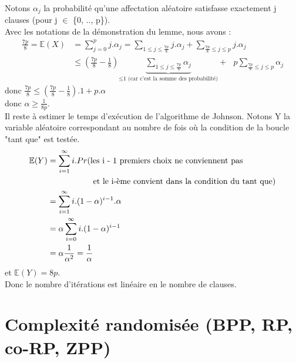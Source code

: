\documentclass[12pt,a4paper]{article}
\newcommand\tab[1][0.65cm]{\hspace*{#1}}
\begin{document}
Notons $\alpha_j$ la probabilité qu'une affectation aléatoire satisfasse exactement j clauses (pour j $\in$ \{0, .., p\}).\\
Avec les notations de la démonstration du lemme, nous avons :
\begin{equation}
\begin{split}\nonumber
\frac{7p}{8} = \mathbb{E}(X) &= \sum\limits_{j = 0}^{p} j.\alpha_j = \sum\limits_{1 \leq j \leq \frac{7p}{8}} j.\alpha_j + \sum\limits_{\frac{7p}{8} \leq j \leq p} j.\alpha_j\\
&\leq (\frac{7p}{8} - \frac{1}{8})\underbrace{\sum\limits_{1 \leq j \leq \frac{7p}{8}} \alpha_j}_{\leq \text{1 (car c'est la somme des probabilité)}} + \text{ }p \sum\limits_{\frac{7p}{8} \leq j \leq p} \alpha_j
\end{split}
\end{equation}
donc $\frac{7p}{8} \leq (\frac{7p}{8} - \frac{1}{8}).1 + p.\alpha$\\
donc $\alpha \geq \frac{1}{8p}$.\\
Il reste à estimer le temps d'exécution de l'algorithme de Johnson. Notons Y la variable aléatoire correspondant au nombre de fois où la condition de la boucle "tant que" est testée.
\begin{equation}
\begin{split}\nonumber
\mathbb{E}(Y) &= \sum\limits_{i = 1}^{\infty} i.Pr(\text{les i - 1 premiers choix ne conviennent pas}\\
&\text{\tab \tab \tab et le i-ème convient dans la condition du tant que})\\
&= \sum\limits_{i = 1}^{\infty} i.(1 - \alpha)^{i - 1}.\alpha\\
&= \alpha\sum\limits_{i = 0}^{\infty} i.(1 - \alpha)^{i - 1}\\
&= \alpha\frac{1}{\alpha^2} = \frac{1}{\alpha}
\end{split}
\end{equation}
et $\mathbb{E}(Y) = 8p$.\\
Donc le nombre d'itérations est linéaire en le nombre de clauses.
\section{Complexité randomisée (BPP, RP, co-RP, ZPP)}
\end{document}
